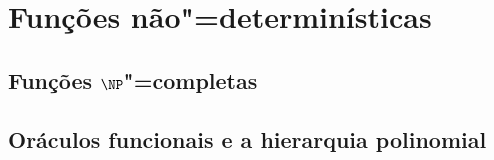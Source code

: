 \chapter{Funções não"=determinísticas}




\section{Funções $\NP$"=completas}
\section{Oráculos funcionais e a hierarquia polinomial}
